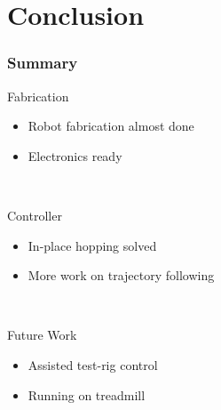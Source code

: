 \section{Conclusion}

\begin{frame}
\frametitle{Summary}
\begin{block}{Fabrication}
\begin{itemize}
  \item 
  Robot fabrication almost done\\[0.1in]
  \item
  Electronics ready\\[0.1in]
\end{itemize} 
\end{block}\\[0.2in]

\begin{block}{Controller}
\begin{itemize}
  \item 
  In-place hopping solved\\[0.1in]
  \item
  More work on trajectory following\\[0.1in]
\end{itemize} 
\end{block}\\[0.2in]

\begin{block}{Future Work}
\begin{itemize}
  \item 
  Assisted test-rig control\\[0.1in]
  \item
  Running on treadmill
\end{itemize} 
\end{block}
\end{frame}
